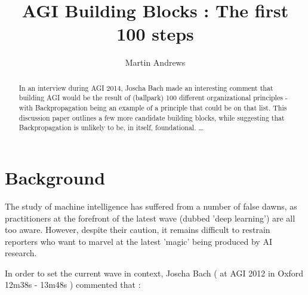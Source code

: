 \documentclass{llncs}
\begin{document}
%
\frontmatter          %
%
\pagestyle{headings}  %
%
\mainmatter              %
%
\title{AGI Building Blocks : The first 100 steps}
%
%
\author{Martin Andrews}
%
%
%

\maketitle              %

\begin{abstract}
In an interview during AGI 2014, Joscha Bach made an interesting comment that 
building AGI would be the result of (ballpark) 100 different organizational principles - 
with Backpropagation being an example of a principle that could be on that list.  
This discussion paper outlines a few more candidate building blocks, 
while suggesting that Backpropagation is unlikely to be,  in itself, foundational.  
\dots
{}
\end{abstract}
%

\section{Background}
The study of machine intelligence has suffered from a number of false dawns, 
as practitioners at the forefront of the latest wave (dubbed 'deep learning') 
are all too aware.
However, despite their caution, it remains difficult to restrain reporters
who want to marvel at the latest 'magic' being produced by AI research.

In order to set the current wave in context, Joscha Bach 
( at AGI 2012 in Oxford 12m38s - 13m48s )  commented that :
\end{document}
